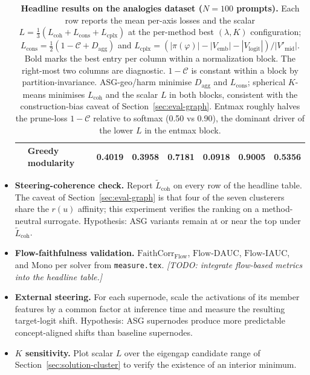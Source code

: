 \begin{itemize}[leftmargin=*,topsep=2pt,itemsep=2pt]
\begin{table}[t]
\begin{tabular}{l l r r r r r r}
 & Greedy modularity        & 0.4019 & 0.3958 & 0.7181 & \textbf{0.0918} & 0.9005 & 0.5356 \\
\bottomrule
\end{tabular}
\caption{\textbf{Headline results on the analogies dataset
($N=100$ prompts).} Each row reports the mean per-axis losses and
the scalar $L = \tfrac{1}{3}(L_{\text{coh}} + L_{\text{cons}} +
L_{\text{cplx}})$ at the per-method best $(\lambda, K)$
configuration; $L_{\text{cons}} = \tfrac{1}{2}(1 - \mathcal{C} +
D_{\text{agg}})$ and
$L_{\text{cplx}} = (|\pi(\varphi)| - |V_{\text{emb}}| -
|V_{\text{logit}}|) / |V'_{\text{mid}}|$. Bold marks the best entry
per column within a normalization block. The right-most two columns
are diagnostic. $1 - \mathcal{C}$ is constant within a block by
partition-invariance. ASG-geo/harm minimise $D_{\text{agg}}$ and
$L_{\text{cons}}$; spherical $K$-means minimises $L_{\text{coh}}$
and the scalar $L$ in both blocks, consistent with the
construction-bias caveat of Section~\ref{sec:eval-graph}. Entmax
roughly halves the prune-loss $1 - \mathcal{C}$ relative to softmax
(0.50 vs 0.90), the dominant driver of the lower $L$ in the entmax
block.}
\label{tab:headline}
\end{table}

\item \textbf{Steering-coherence check.} Report
$\tilde{L}_{\text{coh}}$ on every row of the headline table. The
caveat of Section~\ref{sec:eval-graph} is that four of the seven
clusterers share the $r(u)$ affinity; this experiment verifies the
ranking on a method-neutral surrogate. Hypothesis: ASG variants
remain at or near the top under $\tilde{L}_{\text{coh}}$.

\item \textbf{Flow-faithfulness validation.}
$\mathrm{FaithCorr}_{\mathrm{Flow}}$, $\mathrm{Flow}\text{-}\mathrm{DAUC}$,
$\mathrm{Flow}\text{-}\mathrm{IAUC}$, and $\mathrm{Mono}$ per solver
from \texttt{measure.tex}. \textit{[TODO: integrate flow-based
metrics into the headline table.]}

\item \textbf{External steering.} For each supernode, scale the
activations of its member features by a common factor at inference
time and measure the resulting target-logit shift. Hypothesis: ASG
supernodes produce more predictable concept-aligned shifts than
baseline supernodes.

\item \textbf{$K$ sensitivity.} Plot scalar $L$ over the eigengap
candidate range of Section~\ref{sec:solution-cluster} to verify the
existence of an interior minimum.
\end{itemize}